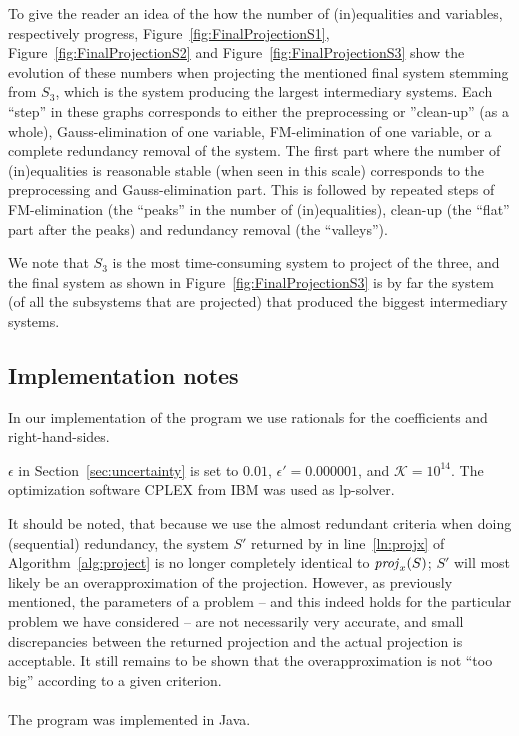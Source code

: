 To give the reader an idea of the how the number of (in)equalities and variables, respectively progress, Figure~\ref{fig:FinalProjectionS1}, Figure~\ref{fig:FinalProjectionS2} and Figure~\ref{fig:FinalProjectionS3} show the evolution of these numbers when projecting the mentioned final system stemming from $S_3$, which is the system producing the largest intermediary systems. Each ``step'' in these graphs corresponds to either the preprocessing or ''clean-up'' (as a whole), Gauss-elimination of one variable, FM-elimination of one variable, or a complete redundancy removal of the system. The first part where the number of (in)equalities is reasonable stable (when seen in this scale) corresponds to the preprocessing and Gauss-elimination part. 
This is followed by repeated steps of FM-elimination (the ``peaks'' in the number of (in)equalities), clean-up (the ``flat'' part after the peaks) and redundancy removal (the ``valleys'').

We note that $S_3$ is the most time-consuming system to project of the three, and the final system as shown in Figure~\ref{fig:FinalProjectionS3} is by far the system (of all the subsystems that are projected) that produced the biggest intermediary systems.  

\subsection{Implementation notes}
{In our implementation of the program we use rationals for the coefficients and right-hand-sides}.

$\epsilon$ in Section~\ref{sec:uncertainty} is set to $0.01$, $\epsilon' = 0.000001$, and $\mathcal{K} = 10^{14}$. The optimization software CPLEX from IBM was used as lp-solver. 

{It should be noted, that because we use the almost redundant criteria when doing (sequential) redundancy, the system $S'$ returned by  in line~\ref{ln:projx} of Algorithm~\ref{alg:project} is no longer completely identical to $\mathit{proj}_x(S)$; $S'$ will most likely be an overapproximation of the projection. However, as previously mentioned, the parameters of a problem -- and this indeed holds for the particular problem we have considered -- are not necessarily very accurate, and small discrepancies between the returned projection and the actual projection is acceptable. It still remains to be shown that the overapproximation is not ``too big'' according to a given criterion.}
\\
\\
The program was implemented in Java.


